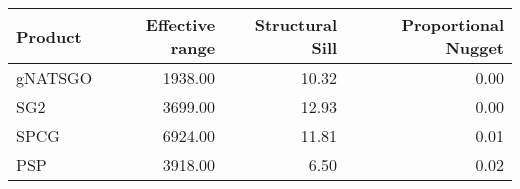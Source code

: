 % 
\begin{tabular}{lrrr}
  \hline
Product & Effective range & Structural Sill & Proportional Nugget \\ 
  \hline
gNATSGO & 1938.00 & 10.32 & 0.00 \\ 
  SG2 & 3699.00 & 12.93 & 0.00 \\ 
  SPCG & 6924.00 & 11.81 & 0.01 \\ 
  PSP & 3918.00 & 6.50 & 0.02 \\ 
   \hline
\end{tabular}
